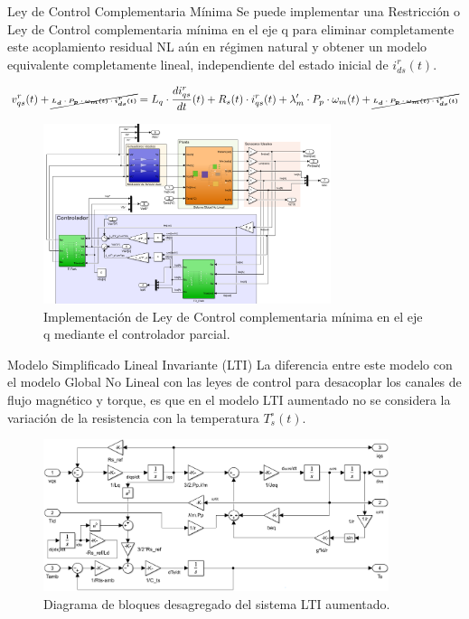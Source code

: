 \documentclass[12pt]{beamer}
\begin{document}
\begin{frame}{Ley de Control Complementaria Mínima}
    \scriptsize
    Se puede implementar una Restricción o Ley de Control complementaria mínima en el eje q para eliminar completamente este acoplamiento residual NL aún en régimen natural
    y obtener un modelo equivalente completamente lineal, independiente del estado inicial de
    \(i^r_{ds}(t)\).
    
    \begin{equation}
    \tiny
    v^r_{qs}(t) + \cancel{\boldsymbol{L_d\cdot P_p\cdot\omega_m(t)\cdot i^r_{ds}(t)}} = L_q\cdot \frac{di^r_{qs}}{dt}(t) + R_s(t)\cdot i^r_{qs}(t) + \lambda'_m\cdot P_p\cdot\omega_m(t) + \cancel{\boldsymbol{L_d\cdot P_p\cdot\omega_m(t)\cdot i^r_{ds}(t)}}
    \end{equation}
    \begin{figure}[h]
    \centering
    \includegraphics[width=0.75\textwidth]{Imagenes/BloquesLinealizacionRealimentacionNoLinealDesacoplo.png}
    \caption{Implementación de Ley de Control complementaria mínima en el eje q mediante el controlador parcial.}
    \end{figure}
\end{frame}

\begin{frame}{Modelo Simplificado Lineal Invariante (LTI)}
    \scriptsize
    La diferencia entre este modelo con el modelo Global No Lineal con las leyes de control para desacoplar los canales de flujo magnético y torque, es que en el modelo LTI aumentado no se considera la variación de la resistencia con la temperatura \(T^\circ_s(t)\).

\begin{figure}[H]
    \centering
    \includegraphics[width=0.9\textwidth]{Imagenes/SistEqLTI_aumentado.png}
    \caption{Diagrama de bloques desagregado del sistema LTI aumentado.}
    \label{fig:diagrama_sistema_LTI_aumentado}
\end{figure}
\end{frame}
\end{document}
